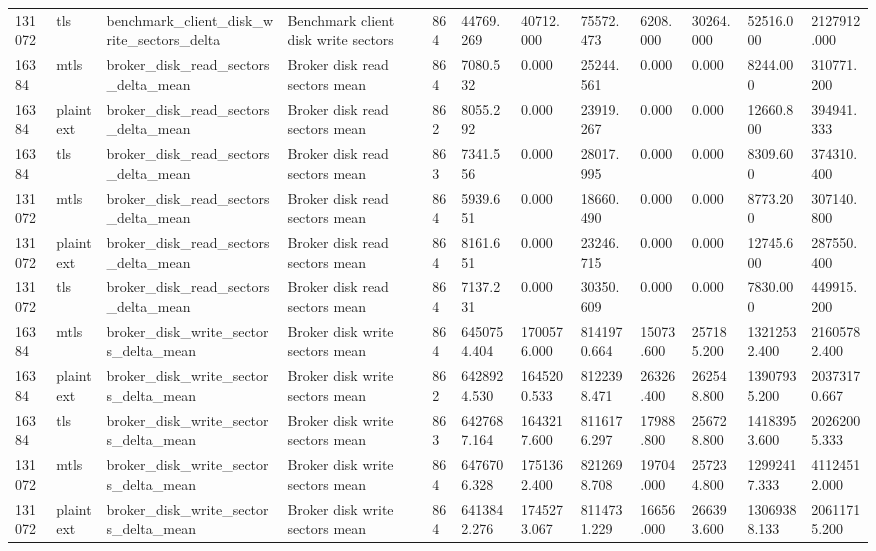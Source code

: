 \begin{longtable}{llllllllllll}
131072 & tls & benchmark\_client\_disk\_write\_sectors\_delta & Benchmark client disk write sectors & 864 & 44769.269 & 40712.000 & 75572.473 & 6208.000 & 30264.000 & 52516.000 & 2127912.000 \\
16384 & mtls & broker\_disk\_read\_sectors\_delta\_mean & Broker disk read sectors mean & 864 & 7080.532 & 0.000 & 25244.561 & 0.000 & 0.000 & 8244.000 & 310771.200 \\
16384 & plaintext & broker\_disk\_read\_sectors\_delta\_mean & Broker disk read sectors mean & 862 & 8055.292 & 0.000 & 23919.267 & 0.000 & 0.000 & 12660.800 & 394941.333 \\
16384 & tls & broker\_disk\_read\_sectors\_delta\_mean & Broker disk read sectors mean & 863 & 7341.556 & 0.000 & 28017.995 & 0.000 & 0.000 & 8309.600 & 374310.400 \\
131072 & mtls & broker\_disk\_read\_sectors\_delta\_mean & Broker disk read sectors mean & 864 & 5939.651 & 0.000 & 18660.490 & 0.000 & 0.000 & 8773.200 & 307140.800 \\
131072 & plaintext & broker\_disk\_read\_sectors\_delta\_mean & Broker disk read sectors mean & 864 & 8161.651 & 0.000 & 23246.715 & 0.000 & 0.000 & 12745.600 & 287550.400 \\
131072 & tls & broker\_disk\_read\_sectors\_delta\_mean & Broker disk read sectors mean & 864 & 7137.231 & 0.000 & 30350.609 & 0.000 & 0.000 & 7830.000 & 449915.200 \\
16384 & mtls & broker\_disk\_write\_sectors\_delta\_mean & Broker disk write sectors mean & 864 & 6450754.404 & 1700576.000 & 8141970.664 & 15073.600 & 257185.200 & 13212532.400 & 21605782.400 \\
16384 & plaintext & broker\_disk\_write\_sectors\_delta\_mean & Broker disk write sectors mean & 862 & 6428924.530 & 1645200.533 & 8122398.471 & 26326.400 & 262548.800 & 13907935.200 & 20373170.667 \\
16384 & tls & broker\_disk\_write\_sectors\_delta\_mean & Broker disk write sectors mean & 863 & 6427687.164 & 1643217.600 & 8116176.297 & 17988.800 & 256728.800 & 14183953.600 & 20262005.333 \\
131072 & mtls & broker\_disk\_write\_sectors\_delta\_mean & Broker disk write sectors mean & 864 & 6476706.328 & 1751362.400 & 8212698.708 & 19704.000 & 257234.800 & 12992417.333 & 41124512.000 \\
131072 & plaintext & broker\_disk\_write\_sectors\_delta\_mean & Broker disk write sectors mean & 864 & 6413842.276 & 1745273.067 & 8114731.229 & 16656.000 & 266393.600 & 13069388.133 & 20611715.200 \\

\end{longtable}
